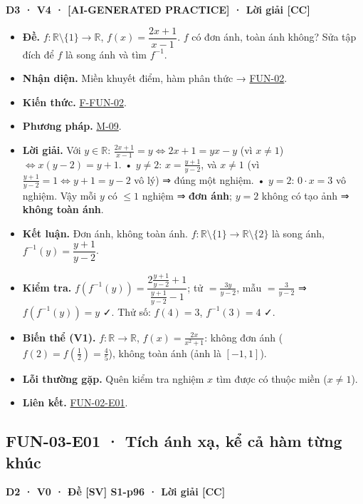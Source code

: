 \documentclass[
  10pt,
  twoside,openany]{book}
\providecommand{\tightlist}{%
  \setlength{\itemsep}{0pt}\setlength{\parskip}{0pt}}
\begin{document}
\textbf{D3 · V4 · {[}AI-GENERATED PRACTICE{]} · Lời giải {[}CC{]}}

\begin{itemize}
\tightlist
\item
  \textbf{Đề.} \(f:\mathbb R\setminus\{1\}\to\mathbb R\),
  \(f(x)=\dfrac{2x+1}{x-1}\). \(f\) có đơn ánh, toàn ánh không? Sửa tập
  đích để \(f\) là song ánh và tìm \(f^{-1}\).
\item
  \textbf{Nhận diện.} Miền khuyết điểm, hàm phân thức →
  \protect\hyperlink{FUN-02}{FUN-02}.
\item
  \textbf{Kiến thức.} \protect\hyperlink{F-FUN-02}{F-FUN-02}.
\item
  \textbf{Phương pháp.} \protect\hyperlink{M-09}{M-09}.
\item
  \textbf{Lời giải.} Với \(y\in\mathbb R\):
  \(\frac{2x+1}{x-1}=y\Leftrightarrow2x+1=yx-y\) (vì \(x\ne1\))
  \(\Leftrightarrow x(y-2)=y+1\). • \(y\ne2\): \(x=\frac{y+1}{y-2}\), và
  \(x\ne1\) (vì \(\frac{y+1}{y-2}=1\Leftrightarrow y+1=y-2\) vô lý) ⇒
  đúng một nghiệm. • \(y=2\): \(0\cdot x=3\) vô nghiệm. Vậy mỗi \(y\) có
  \(\le1\) nghiệm ⇒ \textbf{đơn ánh}; \(y=2\) không có tạo ảnh ⇒
  \textbf{không toàn ánh}.
\item
  \textbf{Kết luận.} Đơn ánh, không toàn ánh.
  \(f:\mathbb R\setminus\{1\}\to\mathbb R\setminus\{2\}\) là song ánh,
  \(f^{-1}(y)=\dfrac{y+1}{y-2}\).
\item
  \textbf{Kiểm tra.}
  \(f(f^{-1}(y))=\dfrac{2\frac{y+1}{y-2}+1}{\frac{y+1}{y-2}-1}\); tử
  \(=\frac{3y}{y-2}\), mẫu \(=\frac{3}{y-2}\) ⇒ \(f(f^{-1}(y))=y\) ✓.
  Thử số: \(f(4)=3\), \(f^{-1}(3)=4\) ✓.
\item
  \textbf{Biến thể (V1).} \(f:\mathbb R\to\mathbb R\),
  \(f(x)=\frac{2x}{x^2+1}\): không đơn ánh
  (\(f(2)=f(\tfrac12)=\tfrac45\)), không toàn ánh (ảnh là \([-1,1]\)).
\item
  \textbf{Lỗi thường gặp.} Quên kiểm tra nghiệm \(x\) tìm được có thuộc
  miền (\(x\ne1\)).
\item
  \textbf{Liên kết.} \protect\hyperlink{FUN-02-E01}{FUN-02-E01}.
\end{itemize}

\hypertarget{FUN-03-E01}{%
\subsection{FUN-03-E01 · Tích ánh xạ, kể cả hàm từng
khúc}\label{FUN-03-E01}}

\textbf{D2 · V0 · Đề {[}SV{]} S1-p96 · Lời giải {[}CC{]}}
\end{document}
